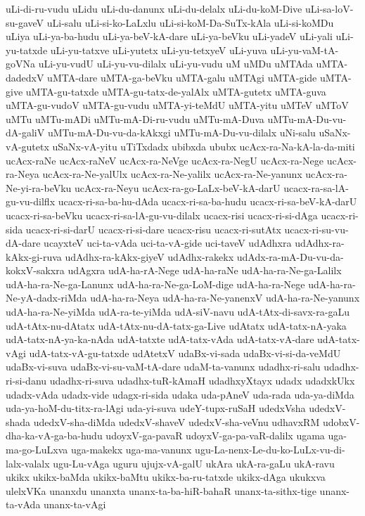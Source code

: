 {uLi-di-ru-vudu
uLidu
uLi-du-danunx
uLi-du-delalx
uLi-du-koM-Dive
uLi-sa-loV-su-gaveV
uLi-salu
uLi-si-ko-LaLxlu
uLi-si-koM-Da-SuTx-kAla
uLi-si-koMDu
uLiya
uLi-ya-ba-hudu
uLi-ya-beV-kA-dare
uLi-ya-beVku
uLi-yadeV
uLi-yali
uLi-yu-tatxde
uLi-yu-tatxve
uLi-yutetx
uLi-yu-tetxyeV
uLi-yuva
uLi-yu-vaM-tA-goVNa
uLi-yu-vudU
uLi-yu-vu-dilalx
uLi-yu-vudu
uM
uMDu
uMTAda
uMTA-dadedxV
uMTA-dare
uMTA-ga-beVku
uMTA-galu
uMTAgi
uMTA-gide
uMTA-give
uMTA-gu-tatxde
uMTA-gu-tatx-de-yalAlx
uMTA-gutetx
uMTA-guva
uMTA-gu-vudoV
uMTA-gu-vudu
uMTA-yi-teMdU
uMTA-yitu
uMTeV
uMToV
uMTu
uMTu-mADi
uMTu-mA-Di-ru-vudu
uMTu-mA-Duva
uMTu-mA-Du-vu-dA-galiV
uMTu-mA-Du-vu-da-kAkxgi
uMTu-mA-Du-vu-dilalx
uNi-salu
uSaNx-vA-gutetx
uSaNx-vA-yitu
uTiTxdadx
ubibxda
ububx
ucAcx-ra-Na-kA-la-da-miti
ucAcx-raNe
ucAcx-raNeV
ucAcx-ra-NeVge
ucAcx-ra-NegU
ucAcx-ra-Nege
ucAcx-ra-Neya
ucAcx-ra-Ne-yalUlx
ucAcx-ra-Ne-yalilx
ucAcx-ra-Ne-yanunx
ucAcx-ra-Ne-yi-ra-beVku
ucAcx-ra-Neyu
ucAcx-ra-go-LaLx-beV-kA-darU
ucacx-ra-sa-lA-gu-vu-dilflx
ucacx-ri-sa-ba-hu-dAda
ucacx-ri-sa-ba-hudu
ucacx-ri-sa-beV-kA-darU
ucacx-ri-sa-beVku
ucacx-ri-sa-lA-gu-vu-dilalx
ucacx-risi
ucacx-ri-si-dAga
ucacx-ri-sida
ucacx-ri-si-darU
ucacx-ri-si-dare
ucacx-risu
ucacx-ri-sutAtx
ucacx-ri-su-vu-dA-dare
ucayxteV
uci-ta-vAda
uci-ta-vA-gide
uci-taveV
udAdhxra
udAdhx-ra-kAkx-gi-ruva
udAdhx-ra-kAkx-giyeV
udAdhx-rakekx
udAdx-ra-mA-Du-vu-da-kokxV-sakxra
udAgxra
udA-ha-rA-Nege
udA-ha-raNe
udA-ha-ra-Ne-ga-Lalilx
udA-ha-ra-Ne-ga-Lanunx
udA-ha-ra-Ne-ga-LoM-dige
udA-ha-ra-Nege
udA-ha-ra-Ne-yA-dadx-riMda
udA-ha-ra-Neya
udA-ha-ra-Ne-yanenxV
udA-ha-ra-Ne-yanunx
udA-ha-ra-Ne-yiMda
udA-ra-te-yiMda
udA-siV-navu
udA-tAtx-di-savx-ra-gaLu
udA-tAtx-nu-dAtatx
udA-tAtx-nu-dA-tatx-ga-Live
udAtatx
udA-tatx-nA-yaka
udA-tatx-nA-ya-ka-nAda
udA-tatxte
udA-tatx-vAda
udA-tatx-vA-dare
udA-tatx-vAgi
udA-tatx-vA-gu-tatxde
udAtetxV
udaBx-vi-sada
udaBx-vi-si-da-veMdU
udaBx-vi-suva
udaBx-vi-su-vaM-tA-dare
udaM-ta-vanunx
udadhx-ri-salu
udadhx-ri-si-danu
udadhx-ri-suva
udadhx-tuR-kAmaH
udadhxyXtayx
udadx
udadxkUkx
udadx-vAda
udadx-vide
udagx-ri-sida
udaka
uda-pAneV
uda-rada
uda-ya-diMda
uda-ya-hoM-du-titx-ra-lAgi
uda-yi-suva
udeY-tupx-ruSaH
udedxVsha
udedxV-shada
udedxV-sha-diMda
udedxV-shaveV
udedxV-sha-veVnu
udhavxRM
udobxV-dha-ka-vA-ga-ba-hudu
udoyxV-ga-pavaR
udoyxV-ga-pa-vaR-dalilx
ugama
uga-ma-go-LuLxva
uga-makekx
uga-ma-vanunx
ugu-La-nenx-Le-du-ko-LuLx-vu-di-lalx-valalx
ugu-Lu-vAga
uguru
ujujx-vA-galU
ukAra
ukA-ra-gaLu
ukA-ravu
ukikx
ukikx-baMda
ukikx-baMtu
ukikx-ba-ru-tatxde
ukikx-dAga
ukukxva
ulelxVKa
unanxdu
unanxta
unanx-ta-ba-hiR-bahaR
unanx-ta-sithx-tige
unanx-ta-vAda
unanx-ta-vAgi
}
